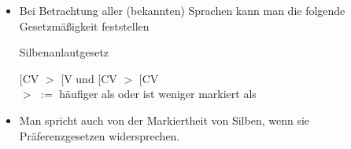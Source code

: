 
\begin{frame}

\begin{itemize}
	\item Bei Betrachtung aller (bekannten) Sprachen kann man die folgende Gesetzmäßigkeit feststellen \citep[cf.][212f.]{Hall00a}
	
	\begin{block}{Silbenanlautgesetz}
	
	\sub{$\sigma$}[CV $>$ \sub{$\sigma$}[V 
	und
	\sub{$\sigma$}[CV $>$ \sub{$\sigma$}[CV \\
	$>$ $:=$ häufiger als oder ist weniger markiert als 



	
	\end{block}
	 
	 \item Man spricht auch von der Markiertheit von Silben, wenn sie Präferenzgesetzen widersprechen.

\end{itemize}

\end{frame}




